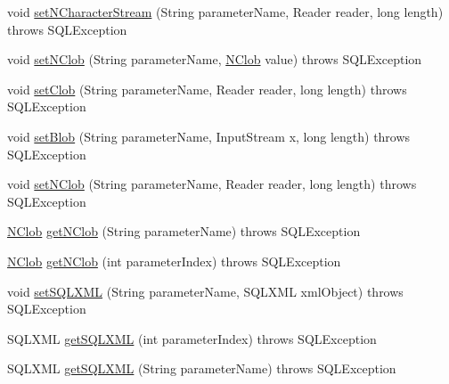 \begin{DoxyCompactItemize}
\item 
void \mbox{\hyperlink{classcom_1_1mysql_1_1cj_1_1jdbc_1_1_callable_statement_wrapper_a43950dd560f5be72b6c7136db24791d2}{set\+N\+Character\+Stream}} (String parameter\+Name, Reader reader, long length)  throws S\+Q\+L\+Exception 
\item 
void \mbox{\hyperlink{classcom_1_1mysql_1_1cj_1_1jdbc_1_1_callable_statement_wrapper_a760d8d5eeb6beda2136975b75a59ba3c}{set\+N\+Clob}} (String parameter\+Name, \mbox{\hyperlink{classcom_1_1mysql_1_1cj_1_1jdbc_1_1_n_clob}{N\+Clob}} value)  throws S\+Q\+L\+Exception 
\item 
void \mbox{\hyperlink{classcom_1_1mysql_1_1cj_1_1jdbc_1_1_callable_statement_wrapper_a4f0c0d2c54d1f606b358f14cd813c512}{set\+Clob}} (String parameter\+Name, Reader reader, long length)  throws S\+Q\+L\+Exception 
\item 
void \mbox{\hyperlink{classcom_1_1mysql_1_1cj_1_1jdbc_1_1_callable_statement_wrapper_a1974f16b798c706bd3681e3389f53fe3}{set\+Blob}} (String parameter\+Name, Input\+Stream x, long length)  throws S\+Q\+L\+Exception 
\item 
void \mbox{\hyperlink{classcom_1_1mysql_1_1cj_1_1jdbc_1_1_callable_statement_wrapper_a4935cb1ad5e7c4f68ce3a3a5f7e2b542}{set\+N\+Clob}} (String parameter\+Name, Reader reader, long length)  throws S\+Q\+L\+Exception 
\item 
\mbox{\hyperlink{classcom_1_1mysql_1_1cj_1_1jdbc_1_1_n_clob}{N\+Clob}} \mbox{\hyperlink{classcom_1_1mysql_1_1cj_1_1jdbc_1_1_callable_statement_wrapper_af5b953f4902e3556ae6413d8a4511d67}{get\+N\+Clob}} (String parameter\+Name)  throws S\+Q\+L\+Exception 
\item 
\mbox{\hyperlink{classcom_1_1mysql_1_1cj_1_1jdbc_1_1_n_clob}{N\+Clob}} \mbox{\hyperlink{classcom_1_1mysql_1_1cj_1_1jdbc_1_1_callable_statement_wrapper_abe8d5eac91ef25deeb1ea7d93347f4ab}{get\+N\+Clob}} (int parameter\+Index)  throws S\+Q\+L\+Exception 
\item 
void \mbox{\hyperlink{classcom_1_1mysql_1_1cj_1_1jdbc_1_1_callable_statement_wrapper_a885797b88f92cf77bf9db32504077b0c}{set\+S\+Q\+L\+X\+ML}} (String parameter\+Name, S\+Q\+L\+X\+ML xml\+Object)  throws S\+Q\+L\+Exception 
\item 
S\+Q\+L\+X\+ML \mbox{\hyperlink{classcom_1_1mysql_1_1cj_1_1jdbc_1_1_callable_statement_wrapper_acaea5b4f0f7a3c49b2aa04b100b5ba97}{get\+S\+Q\+L\+X\+ML}} (int parameter\+Index)  throws S\+Q\+L\+Exception 
\item 
S\+Q\+L\+X\+ML \mbox{\hyperlink{classcom_1_1mysql_1_1cj_1_1jdbc_1_1_callable_statement_wrapper_a2a75a8688d617b3469a58574bb1d2ba7}{get\+S\+Q\+L\+X\+ML}} (String parameter\+Name)  throws S\+Q\+L\+Exception 

\end{DoxyCompactItemize}
